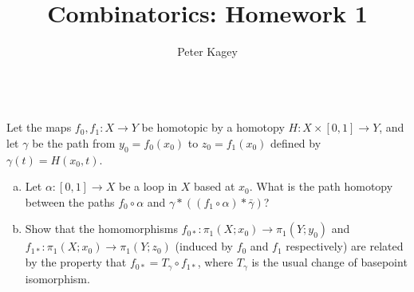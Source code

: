 \documentclass{article}
\newenvironment{problem}[2][Problem]{\begin{trivlist}
\item[\hskip \labelsep {\bfseries #1}\hskip \labelsep {\bfseries #2.}]}{\end{trivlist}}
\begin{document}
\title{Combinatorics: Homework 1}
\author{Peter Kagey}

\maketitle

\begin{problem}{5} \text{} \\
  Let the maps $f_0, f_1\colon X \rightarrow Y$ be homotopic by a homotopy
  $H\colon X \times [0,1] \rightarrow Y$, and let $\gamma$ be the path from
  $y_0 = f_0(x_0)$ to $z_0 = f_1(x_0)$ defined by $\gamma(t) = H(x_0, t)$.
  \begin{enumerate}[(a)]
    \item Let $\alpha\colon[0,1]\rightarrow X$ be a loop in $X$ based at $x_0$.
    What is the path homotopy between the paths $f_0 \circ \alpha$ and
    $\gamma * ((f_1 \circ \alpha) * \bar\gamma)$?
    \item Show that the homomorphisms
    $f_{0*}\colon \pi_1(X; x_0) \rightarrow \pi_1(Y; y_0)$ and
    $f_{1*}\colon \pi_1(X; x_0) \rightarrow \pi_1(Y; z_0)$ (induced by $f_0$ and
    $f_1$ respectively) are related by the property that
    $f_{0*} = T_\gamma \circ f_{1*}$, where $T_\gamma$ is the usual change of
    basepoint isomorphism.
  \end{enumerate}
\end{problem}
\end{document}
